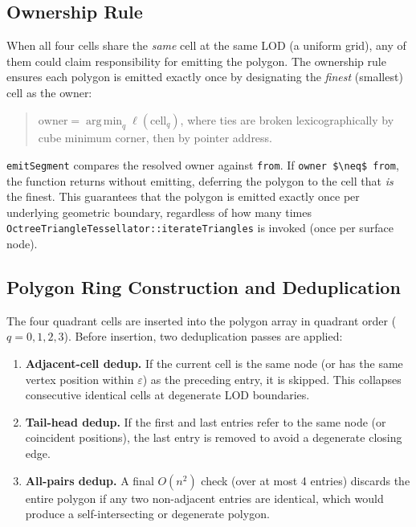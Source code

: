 \documentclass[10pt,a4paper]{article}
\DeclareMathOperator*{\argmin}{arg\,min}
\begin{document}
\subsection{Ownership Rule}
\label{sec:itriangles:ownership}

When all four cells share the \emph{same} cell at the same LOD (a
uniform grid), any of them could claim responsibility for emitting the
polygon.  The ownership rule ensures each polygon is emitted exactly once
by designating the \emph{finest} (smallest) cell as the owner:

\begin{quote}
  $\text{owner} = \argmin_{q} \ell(\text{cell}_q)$,
  where ties are broken lexicographically by cube minimum corner, then by
  pointer address.
\end{quote}

\lstinline{emitSegment} compares the resolved owner against
\lstinline{from}.  If \lstinline{owner $\neq$ from}, the function returns
without emitting, deferring the polygon to the cell that \emph{is} the
finest.  This guarantees that the polygon is emitted exactly once per
underlying geometric boundary, regardless of how many times
\lstinline{OctreeTriangleTessellator::iterateTriangles} is invoked (once per surface node).

\subsection{Polygon Ring Construction and Deduplication}
\label{sec:itriangles:dedup}

The four quadrant cells are inserted into the polygon array in quadrant
order ($q=0,1,2,3$).  Before insertion, two deduplication passes are
applied:

\begin{enumerate}
  \item \textbf{Adjacent-cell dedup.}  If the current cell is the same
    node (or has the same vertex position within $\varepsilon$) as the
    preceding entry, it is skipped.  This collapses consecutive identical
    cells at degenerate LOD boundaries.
  \item \textbf{Tail-head dedup.}  If the first and last entries refer to
    the same node (or coincident positions), the last entry is removed to
    avoid a degenerate closing edge.
  \item \textbf{All-pairs dedup.}  A final $O(n^2)$ check (over at most
    4 entries) discards the entire polygon if any two non-adjacent entries
    are identical, which would produce a self-intersecting or degenerate
    polygon.
\end{enumerate}
\end{document}
